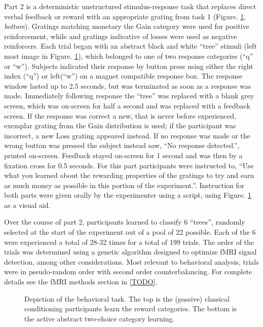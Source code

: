\documentclass[doc,12pt]{apa}        %
\begin{document}
Part 2 is a deterministic unstructured stimulus-response task that replaces direct verbal feedback or reward with an appropriate grating from task 1  (Figure. \ref{fig:task}, \emph{bottom}).  Gratings matching monetary the Gain category were used for positive reinforcement, while and gratings indicative of losses were used as negative reinforcers.   Each trial began with an abstract black and white ``tree'' stimuli (left most image in Figure. \ref{fig:task}), which belonged to one of two response categories (``q'' or ``w'').  Subjects indicated their response by button press using either the right index (``q'') or left(``w'') on a magnet compatible response box.  The response window lasted up to 2.5 seconds, but was terminated as soon as a response was made.  Immediately following response the ``tree'' was replaced with a blank grey screen, which was on-screen for half a second and was replaced with a feedback screen.  If the response was correct a new, that is never before experienced, exemplar grating from the Gain distribution is used; if the participant was incorrect, a new Loss grating appeared instead.  If no response was made or the wrong button was pressed the subject instead saw, ``No response detected.'', printed on-screen.  Feedback stayed on-screen for 1 second and was then by a fixation cross for 0.5 seconds.  For this part participants were instructed to, ``Use what you learned about the rewarding properties of the gratings to try and earn as much money as possible in this portion of the experiment.''.  Instruction for both parts were given orally by the experimenter using a script, using Figure. \ref{fig:task} as a visual aid.

Over the course of part 2, participants learned to classify 6 ``trees'', randomly selected at the start of the experiment out of a pool of 22 possible.  Each of the 6 were experienced a total of 28-32 times for a total of 199 trials. The order of the trials was determined using a genetic algorithm designed to optimize fMRI signal detection, among other considerations.  Most relevant to behavioral analysis, trials were in pseudo-random order with second order counterbalancing.  For complete details see the fMRI methods section in \ref{TODO}.

\begin{figure}[tp]
	\label{fig:task}
	\caption{Depiction of the behavioral task. The top is the (passive) classical conditioning participants learn the reward categories.  The bottom is the active abstract two-choice category learning.}
\end{figure}
\end{document}
